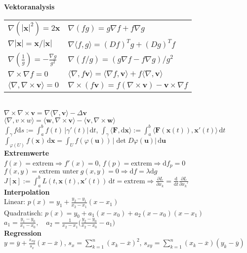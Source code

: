 \documentclass[a4paper,10pt,fleqn,twoside,twocolumn,dvipdfmx]{scrartcl}
\newcommand{\strong}[1]{\textsf{\textbf{#1}}}
\newcommand{\ds}{\displaystyle}
\newcommand{\bvec}[1]{\mathbf{#1}}
\begin{document}
\strong{Vektoranalysis}\\[2pt]
\begin{tabular}{@{}l|l}
$\nabla(|\mathbf x|^2) = 2\mathbf x$ & $\nabla (fg) = g\nabla f+f\nabla g$\\
$\nabla |\mathbf x| = \mathbf x/|\mathbf x|$ & $\nabla\langle f,g\rangle = (Df)^T g+(Dg)^T f$\\
$\nabla (\tfrac{1}{g}) = -\frac{\nabla g}{g^2}$
& $\nabla(f/g) = (g\nabla f-f\nabla g)/g^2$\\
$\nabla\times\nabla f = 0$
& $\langle\nabla,f\bvec v\rangle
= \langle\nabla f,\bvec v\rangle + f\langle\nabla,\bvec v\rangle$\\
$\langle\nabla,\nabla\times\bvec v\rangle = 0$
& $\nabla\times(f\bvec v)
= f(\nabla\times\bvec v) - \bvec v\times \nabla f$
\end{tabular}\\
$\nabla\times\nabla\times\bvec v
= \nabla\langle\nabla,\bvec v\rangle-\Delta\bvec v$\\
$\langle\nabla,v\times w\rangle
= \langle\bvec w,\nabla\times\bvec v\rangle
- \langle\bvec v,\nabla\times\bvec w\rangle$\\
$\int_\gamma f\mathrm ds := \!\int_a^b\! f(t)\,|\gamma'(t)|\,\mathrm dt$,\;
$\int_\gamma\!\langle\bvec F,\mathrm d\bvec x\rangle
:= \!\int_a^b\! \langle\bvec F(\bvec x(t)),\bvec x'(t)\rangle\,\mathrm dt$\\
$\int_{\varphi(U)} f(\bvec x)\,\mathrm d\bvec x
= \int_U f(\varphi(\bvec u))\,|{\det D\varphi(\bvec u)}|\,
\mathrm d\bvec u$\\[4pt]
\strong{Extremwerte}\\[2pt]
$f(x)=\text{extrem} \Rightarrow f'(x)=0$,\; $f(p)=\text{extrem} \Rightarrow \mathrm df_p=0$\\
$f(x,y)=\text{extrem unter}\;g(x,y)=0 \Rightarrow \mathrm df = \lambda\mathrm dg$\\
$\ds J[\bvec x] := {\textstyle\int_a^b} L(t,\bvec x(t),\bvec x'(t))\,\mathrm dt
= \text{extrem}
\Rightarrow\frac{\partial L}{\partial x_k}
= \frac{\mathrm d}{\mathrm dt}\frac{\partial L}{\partial x_k'}$\\
\strong{Interpolation}\\
Linear: $\ds p(x) = y_1+\frac{y_2-y_1}{x_2-x_1}(x-x_1)$\\
Quadratisch: $p(x) = y_0+a_1(x-x_0)+a_2(x-x_0)(x-x_1)$\\
$\ds a_1 = \frac{y_1-y_0}{x_1-x_0},\quad
a_2 = \frac{1}{x_2-x_1}
\Big(\frac{y_2-y_0}{x_2-x_0}-a_1\Big)$\\[4pt]
\strong{Regression}\\[2pt]
$\ds y = \overline y + \frac{s_{xy}}{s_x}(x{-}\overline x)$,\;
$s_x = \sum\limits_{k=1}^n (x_k{-}\overline x)^2$,\;
$s_{xy} = \sum\limits_{k=1}^n (x_k{-}\overline x)(y_k{-}\overline y)$
\end{document}
